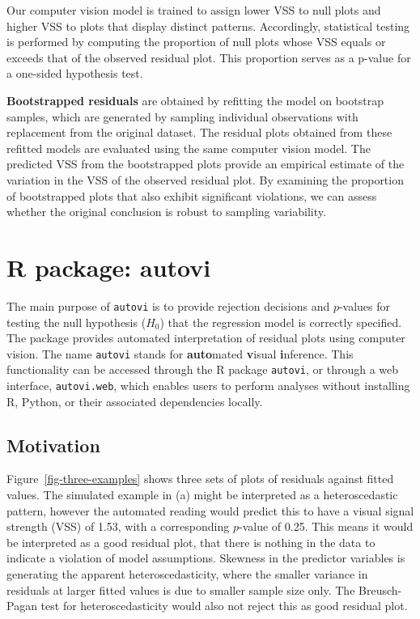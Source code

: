 \documentclass[
doublespace,
  times]{anzsauth}
\begin{document}
Our computer vision model is trained to assign lower VSS to null plots
and higher VSS to plots that display distinct patterns. Accordingly,
statistical testing is performed by computing the proportion of null
plots whose VSS equals or exceeds that of the observed residual plot.
This proportion serves as a p-value for a one-sided hypothesis test.

\textbf{Bootstrapped residuals} are obtained by refitting the model on
bootstrap samples, which are generated by sampling individual
observations with replacement from the original dataset. The residual
plots obtained from these refitted models are evaluated using the same
computer vision model. The predicted VSS from the bootstrapped plots
provide an empirical estimate of the variation in the VSS of the
observed residual plot. By examining the proportion of bootstrapped
plots that also exhibit significant violations, we can assess whether
the original conclusion is robust to sampling variability.

\section{R package: autovi}\label{sec-autovi}

The main purpose of \texttt{autovi} is to provide rejection decisions
and \(p\)-values for testing the null hypothesis (\(H_0\)) that the
regression model is correctly specified. The package provides automated
interpretation of residual plots using computer vision. The name
\texttt{autovi} stands for \textbf{auto}mated \textbf{v}isual
\textbf{i}nference. This functionality can be accessed through the R
package \texttt{autovi}, or through a web interface,
\texttt{autovi.web}, which enables users to perform analyses without
installing R, Python, or their associated dependencies locally.

\subsection{Motivation}\label{sec-why}

Figure~\ref{fig-three-examples} shows three sets of plots of residuals
against fitted values. The simulated example in (a) might be interpreted
as a heteroscedastic pattern, however the automated reading would
predict this to have a visual signal strength (VSS) of 1.53, with a
corresponding \(p\)-value of 0.25. This means it would be interpreted as
a good residual plot, that there is nothing in the data to indicate a
violation of model assumptions. Skewness in the predictor variables is
generating the apparent heteroscedasticity, where the smaller variance
in residuals at larger fitted values is due to smaller sample size only.
The Breusch-Pagan test \citep{breusch1979simple} for heteroscedasticity
would also not reject this as good residual plot.
\end{document}

